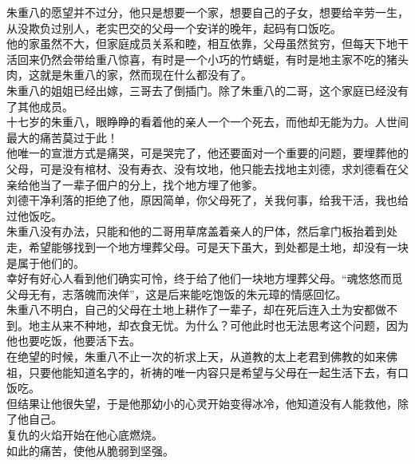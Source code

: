 \begin{multicols}{\theparacolNo}
朱重八的愿望并不过分，他只是想要一个家，想要自己的子女，想要给辛劳一生，从没欺负过别人，老实巴交的父母一个安详的晚年，起码有口饭吃。\\

他的家虽然不大，但家庭成员关系和睦，相互依靠，父母虽然贫穷，但每天下地干活回来仍然会带给重八惊喜，有时是一个小巧的竹蜻蜓，有时是地主家不吃的猪头肉，这就是朱重八的家，然而现在什么都没有了。\\

朱重八的姐姐已经出嫁，三哥去了倒插门。除了朱重八的二哥，这个家庭已经没有了其他成员。\\

十七岁的朱重八，眼睁睁的看着他的亲人一个一个死去，而他却无能为力。人世间最大的痛苦莫过于此！\\

他唯一的宣泄方式是痛哭，可是哭完了，他还要面对一个重要的问题，要埋葬他的父母，可是没有棺材、没有寿衣、没有坟地，他只能去找地主刘德，求刘德看在父亲给他当了一辈子佃户的分上，找个地方埋了他爹。\\

刘德干净利落的拒绝了他，原因简单，你父母死了，关我何事，给我干活，我也给过他饭吃。\\

朱重八没有办法，只能和他的二哥用草席盖着亲人的尸体，然后拿门板抬着到处走，希望能够找到一个地方埋葬父母。可是天下虽大，到处都是土地，却没有一块是属于他们的。\\

幸好有好心人看到他们确实可怜，终于给了他们一块地方埋葬父母。“魂悠悠而觅父母无有，志落魄而泱佯”，这是后来能吃饱饭的朱元璋的情感回忆。\\

朱重八不明白，自己的父母在土地上耕作了一辈子，却在死后连入土为安都做不到。地主从来不种地，却衣食无忧。为什么？可他此时也无法思考这个问题，因为他也要吃饭，他要活下去。\\

在绝望的时候，朱重八不止一次的祈求上天，从道教的太上老君到佛教的如来佛祖，只要他能知道名字的，祈祷的唯一内容只是希望与父母在一起生活下去，有口饭吃。\\

但结果让他很失望，于是他那幼小的心灵开始变得冰冷，他知道没有人能救他，除了他自己。\\

复仇的火焰开始在他心底燃烧。\\

如此的痛苦，使他从脆弱到坚强。\\


\end{multicols}
